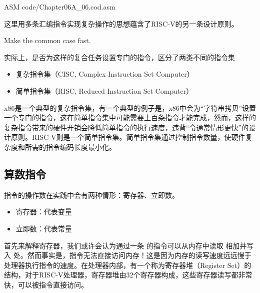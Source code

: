 \begin{Code}[汇编语言中的复杂计算]{ASM}
    code/Chapter06A_06.cod.asm
\end{Code}

这里用多条汇编指令实现复杂操作的思想蕴含了RISC-V的另一条设计原则。
\begin{BoxDesignPrinciple}[令通常情形更快]
    \centering
    Make the common case fast.
\end{BoxDesignPrinciple}

实际上，是否为这样的复合任务设置专门的指令，区分了两类不同的指令集
\begin{itemize}
    \item 复杂指令集（CISC, Complex Instruction Set Computer）
    \item 简单指令集（RISC, Reduced Instruction Set Computer）
\end{itemize}
x86是一个典型的复杂指令集，有一个典型的例子是，x86中会为“字符串拷贝”设置一个专门的指令，这在简单指令集中可能需要上百条指令才能完成，然而，这样的复杂指令带来的硬件开销会降低简单指令的执行速度，违背“令通常情形更快”的设计原则。RISC-V则是一个简单指令集。简单指令集通过控制指令数量，使硬件复杂度和所需的指令编码长度最小化。

\subsection{算数指令}

指令的操作数在实践中会有两种情形：寄存器、立即数。
\begin{itemize}
    \item 寄存器：代表变量
    \item 立即数：代表常量
\end{itemize}

首先来解释寄存器，我们或许会认为通过一条 的指令可以从内存中读取 相加并写入 处。然而事实是，指令无法直接访问内存！这是因为内存的读写速度远远慢于处理器执行指令的速度。在处理器内部，有一个称为寄存器堆（Register Set）的结构，对于RISC-V处理器，寄存器堆由32个寄存器构成，这些寄存器读写都非常快，可以被指令直接访问。

